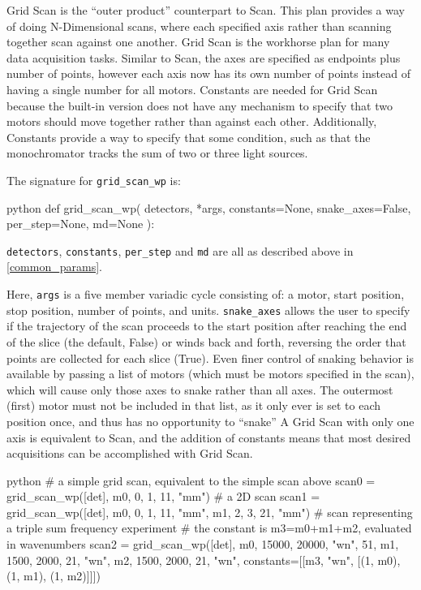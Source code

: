 Grid Scan is the ``outer product'' counterpart to Scan.
This plan provides a way of doing N-Dimensional scans, where each specified axis rather than scanning together scan against one another.
Grid Scan is the workhorse plan for many data acquisition tasks.
Similar to Scan, the axes are specified as endpoints plus number of points, however each axis now has its own number of points instead of having a single number for all motors.
Constants are needed for Grid Scan because the built-in version does not have any mechanism to specify that two motors should move together rather than against each other.
Additionally, Constants provide a way to specify that some condition, such as that the monochromator tracks the sum of two or three light sources.

The signature for \texttt{grid\_scan\_wp} is:

\begin{codefragment}{python}
def grid_scan_wp(
    detectors, *args, constants=None, snake_axes=False, per_step=None, md=None
):
\end{codefragment}

\texttt{detectors}, \texttt{constants}, \texttt{per\_step} and \texttt{md} are all as described above in \ref{common_params}.

Here, \texttt{args} is a five member variadic cycle consisting of: a motor, start position, stop position, number of points, and units.
\texttt{snake\_axes} allows the user to specify if the trajectory of the scan proceeds to the start position after reaching the end of the slice (the default, False) or winds back and forth, reversing the order that points are collected for each slice (True).
Even finer control of snaking behavior is available by passing a list of motors (which must be motors specified in the scan), which will cause only those axes to snake rather than all axes.
The outermost (first) motor must not be included in that list, as it only ever is set to each position once, and thus has no opportunity to ``snake''
A Grid Scan with only one axis is equivalent to Scan, and the addition of constants means that most desired acquisitions can be accomplished with Grid Scan.

\begin{codefragment}{python}
# a simple grid scan, equivalent to the simple scan above
scan0 = grid_scan_wp([det], m0, 0, 1, 11, "mm")
# a 2D scan
scan1 = grid_scan_wp([det], m0, 0, 1, 11, "mm",
                            m1, 2, 3, 21, "mm")
# scan representing a triple sum frequency experiment
# the constant is m3=m0+m1+m2, evaluated in wavenumbers
scan2 = grid_scan_wp([det], m0, 15000, 20000, "wn", 51,
                            m1, 1500, 2000, 21, "wn",
                            m2, 1500, 2000, 21, "wn",
                            constants=[[m3, "wn", [(1, m0), (1, m1), (1, m2)]]])
\end{codefragment}


